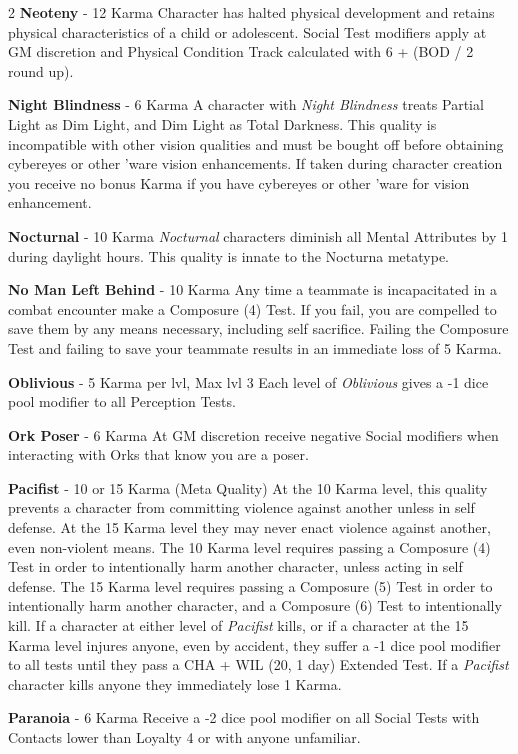 \documentclass[
  oneside]{article}
\begin{document}
\begin{multicols}{2}
\textbf{Neoteny} - 12 Karma Character has halted
physical development and retains physical
characteristics of a child or adolescent. Social
Test modifiers apply at GM discretion and Physical
Condition Track calculated with 6 + (BOD / 2 round
up).

\textbf{Night Blindness} - 6 Karma A character
with \emph{Night Blindness} treats Partial Light
as Dim Light, and Dim Light as Total Darkness.
This quality is incompatible with other vision
qualities and must be bought off before obtaining
cybereyes or other 'ware vision enhancements. If
taken during character creation you receive no
bonus Karma if you have cybereyes or other 'ware
for vision enhancement.

\textbf{Nocturnal} - 10 Karma \emph{Nocturnal}
characters diminish all Mental Attributes by 1
during daylight hours. This quality is innate to
the Nocturna metatype.

\textbf{No Man Left Behind} - 10 Karma Any time a
teammate is incapacitated in a combat encounter
make a Composure (4) Test. If you fail, you are
compelled to save them by any means necessary,
including self sacrifice. Failing the Composure
Test and failing to save your teammate results in
an immediate loss of 5 Karma.

\textbf{Oblivious} - 5 Karma per lvl, Max lvl 3
Each level of \emph{Oblivious} gives a -1 dice
pool modifier to all Perception Tests.

\textbf{Ork Poser} - 6 Karma At GM discretion
receive negative Social modifiers when interacting
with Orks that know you are a poser.

\textbf{Pacifist} - 10 or 15 Karma (Meta Quality)
At the 10 Karma level, this quality prevents a
character from committing violence against another
unless in self defense. At the 15 Karma level they
may never enact violence against another, even
non-violent means. The 10 Karma level requires
passing a Composure (4) Test in order to
intentionally harm another character, unless
acting in self defense. The 15 Karma level
requires passing a Composure (5) Test in order to
intentionally harm another character, and a
Composure (6) Test to intentionally kill. If a
character at either level of \emph{Pacifist}
kills, or if a character at the 15 Karma level
injures anyone, even by accident, they suffer a -1
dice pool modifier to all tests until they pass a
CHA + WIL (20, 1 day) Extended Test. If a
\emph{Pacifist} character kills anyone they
immediately lose 1 Karma.

\textbf{Paranoia} - 6 Karma Receive a -2 dice pool
modifier on all Social Tests with Contacts lower
than Loyalty 4 or with anyone unfamiliar.


\end{multicols}
\end{document}
